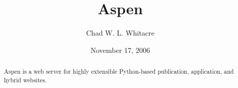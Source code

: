 \documentclass{manual}
\title{Aspen}
\author{Chad W. L. Whitacre}
\date{November 17, 2006} %
\begin{document}
\maketitle

\begin{abstract}

\noindent
Aspen is a web server for highly extensible Python-based publication,
application, and hybrid websites.

\end{abstract}





%
%
\end{document}
